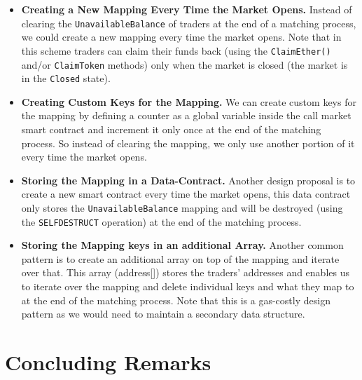 \begin{itemize}

\item \textbf{Creating a New Mapping Every Time the Market Opens.} Instead of clearing the \texttt{UnavailableBalance} of traders at the end of a matching process, we could create a new mapping every time the market opens. Note that in this scheme traders can claim their funds back (using the \texttt{ClaimEther()} and/or \texttt{ClaimToken} methods) only when the market is closed (\ie the market is in the \texttt{Closed} state).

\item \textbf{Creating Custom Keys for the Mapping.} We can create custom keys for the mapping by defining a counter as a global variable inside the call market smart contract and increment it only once at the end of the matching process. So instead of clearing the mapping, we only use another portion of it every time the market opens.

\item \textbf{Storing the Mapping in a Data-Contract.} Another design proposal is to create a new smart contract every time the market opens, this data contract only stores the \texttt{UnavailableBalance} mapping and will be destroyed (using the \texttt{SELFDESTRUCT} operation) at the end of the matching process.

\item \textbf{Storing the Mapping keys in an additional Array.} Another common pattern is to create an additional array on top of the mapping and iterate over that. This array (\eg address[]) stores the traders' addresses and enables us to iterate over the mapping and delete individual keys and what they map to at the end of the matching process. Note that this is a gas-costly design pattern as we would need to maintain a secondary data structure. 

\end{itemize}



\section{Concluding Remarks} 

